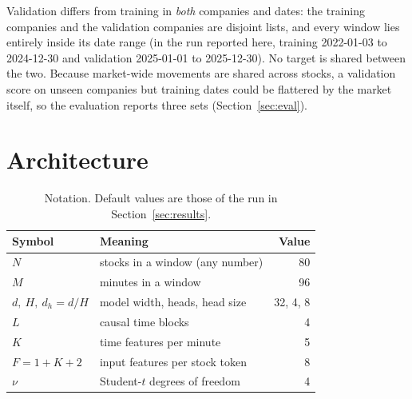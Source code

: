 \documentclass[11pt]{article}
\begin{document}
Validation differs from training in \emph{both} companies and dates: the training companies and the validation companies are
disjoint lists, and every window lies entirely inside its date range (in the run reported here, training
2022-01-03 to 2024-12-30 and validation 2025-01-01 to 2025-12-30). No target is shared between the two. Because
market-wide movements are shared across stocks, a validation score on unseen companies but training dates could be flattered by
the market itself, so the evaluation reports three sets (Section~\ref{sec:eval}).

\section{Architecture}\label{sec:arch}

\begin{table}[h]
\centering
\caption{Notation. Default values are those of the run in Section~\ref{sec:results}.}
\begin{tabular}{@{}llr@{}}
\toprule
Symbol & Meaning & Value \\
\midrule
$N$ & stocks in a window (any number) & 80 \\
$M$ & minutes in a window & 96 \\
$d,\ H,\ d_h=d/H$ & model width, heads, head size & 32, 4, 8 \\
$L$ & causal time blocks & 4 \\
$K$ & time features per minute & 5 \\
$F=1+K+2$ & input features per stock token & 8 \\
$\nu$ & Student-$t$ degrees of freedom & 4 \\
\bottomrule
\end{tabular}
\end{table}
\end{document}
